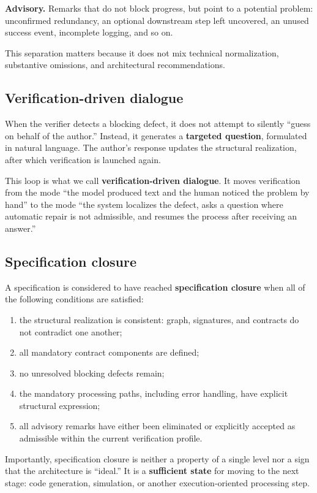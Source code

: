\documentclass[12pt,a4paper]{article}
\begin{document}
\textbf{Advisory.} Remarks that do not block progress, but point to a potential problem: unconfirmed redundancy, an optional downstream step left uncovered, an unused success event, incomplete logging, and so on.

This separation matters because it does not mix technical normalization, substantive omissions, and architectural recommendations.

\subsection{Verification-driven dialogue}

When the verifier detects a blocking defect, it does not attempt to silently ``guess on behalf of the author.'' Instead, it generates a \textbf{targeted question}, formulated in natural language. The author's response updates the structural realization, after which verification is launched again.

This loop is what we call \textbf{verification-driven dialogue}. It moves verification from the mode ``the model produced text and the human noticed the problem by hand'' to the mode ``the system localizes the defect, asks a question where automatic repair is not admissible, and resumes the process after receiving an answer.''

\subsection{Specification closure}

A specification is considered to have reached \textbf{specification closure} when all of the following conditions are satisfied:

\begin{enumerate}
\item the structural realization is consistent: graph, signatures, and contracts do not contradict one another;
\item all mandatory contract components are defined;
\item no unresolved blocking defects remain;
\item the mandatory processing paths, including error handling, have explicit structural expression;
\item all advisory remarks have either been eliminated or explicitly accepted as admissible within the current verification profile.
\end{enumerate}

Importantly, specification closure is neither a property of a single level nor a sign that the architecture is ``ideal.'' It is a \textbf{sufficient state} for moving to the next stage: code generation, simulation, or another execution-oriented processing step.
\end{document}
